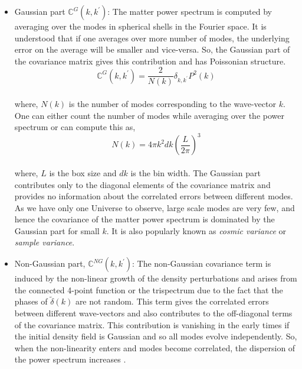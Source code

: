 \documentclass[
  11pt,
  twoside,
  openright,
  titlepage,
  headings=optiontoheadandtoc
]{scrbook}
\begin{document}
\begin{itemize}
	\item Gaussian part $\mathbb{C}^{G}(k,k^{\prime})$: The matter power spectrum is computed
			by averaging over the modes in spherical shells in the Fourier space. It 
			is understood that if one averages over more number of modes, the underlying
			error on the average will be smaller and vice-versa. So, the Gaussian part
			of the covariance matrix gives this contribution and has Poissonian
			structure. 
			\begin{equation}
				\mathbb{C}^{G}(k,k^{\prime}) = \dfrac{2}{N(k)} \delta_{k,k^{\prime}} P^2(k)
			\end{equation}
			\\
			where, $N(k)$ is the number of modes corresponding to the wave-vector $k$. One 
			can either count the number of modes while averaging over the power spectrum
			or can compute this as,
			\begin{equation}
				N(k) = 4 \pi k^2 dk \left( \dfrac{L}{2\pi} \right)^3
			\end{equation}
			\\
			where, $L$ is the box size and $dk$ is the bin width. The Gaussian part 
			contributes only to the diagonal elements of the covariance matrix and provides no 
			information about the correlated errors between different modes. As we have
			only one Universe to observe, large scale modes are very few, and hence
			the covariance of the matter power spectrum is dominated by the Gaussian
			part for small $k$. It is also popularly known as {\it cosmic variance}
			or {\it sample variance}.

	\item Non-Gaussian part, $\mathbb{C}^{NG}(k,k^{\prime})$: 
			The non-Gaussian covariance term is 
			induced by the non-linear growth of the density perturbations and 
			arises from the connected 4-point 
			function or the trispectrum due to the fact that the phases of $\tilde{\delta}(k)$ are 
			not random. This term gives the correlated errors between
			different wave-vectors and also contributes to the off-diagonal terms
			of the covariance matrix. This contribution is vanishing in the early 
			times if the initial density field is Gaussian and so all modes evolve
			independently. So, when the non-linearity enters and modes become
			correlated, the dispersion of the power spectrum increases 
			\cite{1999MNRAS.308.1179M}.


\end{itemize}
\end{document}
